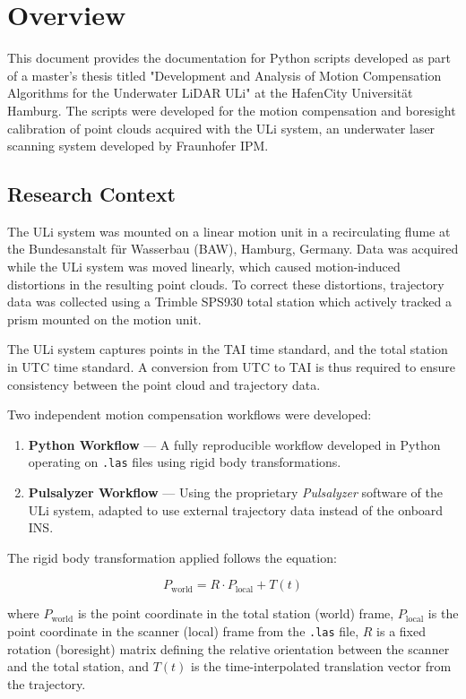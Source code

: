 \chapter{Overview}

This document provides the documentation for Python scripts developed as part of a master's thesis titled "Development and Analysis of Motion Compensation Algorithms for the Underwater LiDAR ULi" at the HafenCity Universität Hamburg. The scripts were developed for the motion compensation and boresight calibration of point clouds acquired with the ULi system, an underwater laser scanning system developed by Fraunhofer IPM.

\section{Research Context}

The ULi system was mounted on a linear motion unit in a recirculating flume at the Bundesanstalt für Wasserbau (BAW), Hamburg, Germany. Data was acquired while the ULi system was moved linearly, which caused motion-induced distortions in the resulting point clouds. To correct these distortions, trajectory data was collected using a Trimble SPS930 total station which actively tracked a prism mounted on the motion unit.

The ULi system captures points in the TAI time standard, and the total station in UTC time standard. A conversion from UTC to TAI is thus required to ensure consistency between the point cloud and trajectory data.

Two independent motion compensation workflows were developed:

\begin{enumerate}
    \item \textbf{Python Workflow} --- A fully reproducible workflow developed in Python operating on \texttt{.las} files using rigid body transformations.
    \item \textbf{Pulsalyzer Workflow} --- Using the proprietary \textit{Pulsalyzer} software of the ULi system, adapted to use external trajectory data instead of the onboard INS.
\end{enumerate}

The rigid body transformation applied follows the equation:

\begin{equation*}
    P_{\text{world}} = R \cdot P_{\text{local}} + T(t)
\end{equation*}

where $P_{\text{world}}$ is the point coordinate in the total station (world) frame, $P_{\text{local}}$ is the point coordinate in the scanner (local) frame from the \texttt{.las} file, $R$ is a fixed rotation (boresight) matrix defining the relative orientation between the scanner and the total station, and $T(t)$ is the time-interpolated translation vector from the trajectory.
